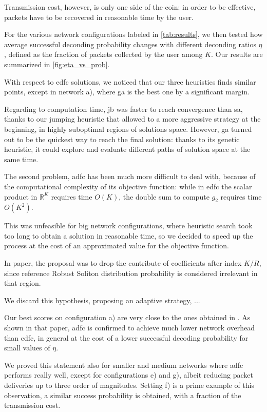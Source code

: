 \documentclass[12pt,journal,draftclsnofoot,onecolumn]{IEEEtran}
\begin{document}
Transmission cost, however, is only one side of the coin: in order to be effective, packets have to be recovered in reasonable time by the user.

For the various network configurations labeled in \autoref{tab:results}, we then tested how average successful deconding probability changes with different deconding ratios $\eta$, defined as the fraction of packets collected by the user among $K$.
Our results are summarized in \autoref{fig:eta_vs_prob}.

\bigbreak
With respect to \gls{edfc} solutions, we noticed that our three heuristics finds similar points, except in network a), where \gls{ga} is the best one by a significant margin.

Regarding to computation time, \gls{jb} was faster to reach convergence than \gls{sa}, thanks to our jumping heuristic that allowed to a more aggressive strategy at the beginning, in highly suboptimal regions of solutions space.
However, \gls{ga} turned out to be the quickest way to reach the final solution: thanks to its genetic heuristic, it could explore and evaluate different paths of solution space at the same time. %

The second problem, \gls{adfc} has been much more difficult to deal with, because of the computational complexity of its objective function: while in \gls{edfc} the scalar product in $\mathbb{R}^K$ requires time $O(K)$, the double sum to compute $g_2$ requires time $O(K^2)$.

This was unfeasible for big network configurations, where heuristic search took too long to obtain a solution in reasonable time, so we decided to speed up the process at the cost of an approximated value for the objective function.

In paper\cite{Lin2007}, the proposal was to drop the contribute of coefficients after index $K/R$, since reference Robust Soliton distribution probability is considered irrelevant in that region.

We discard this hypothesis, proposing an adaptive strategy, ...

Our best scores on configuration a) are very close to the ones obtained in \cite{Lin2007}.
As shown in that paper, \gls{adfc} is confirmed to achieve much lower network overhead than \gls{edfc}, in general at the cost of a lower successful decoding probability for small values of $\eta$.

We proved this statement also for smaller and medium networks where \gls{adfc} performs really well, except for configurations e) and g), albeit reducing packet deliveries up to three order of magnitudes.
Setting f) is a prime example of this observation, a similar success probability is obtained, with a fraction of the transmission cost.
\end{document}

